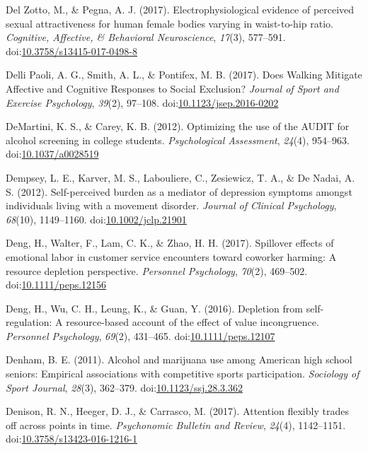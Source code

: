 \documentclass[english,man]{apa6}
\theoremstyle{definition}
\theoremstyle{definition}
\theoremstyle{definition}
\theoremstyle{remark}
\begin{document}
\hypertarget{ref-DelZotto2017}{}
Del Zotto, M., \& Pegna, A. J. (2017). Electrophysiological evidence of
perceived sexual attractiveness for human female bodies varying in
waist-to-hip ratio. \emph{Cognitive, Affective, \& Behavioral
Neuroscience}, \emph{17}(3), 577--591.
doi:\href{https://doi.org/10.3758/s13415-017-0498-8}{10.3758/s13415-017-0498-8}

\hypertarget{ref-Paoli2017}{}
Delli Paoli, A. G., Smith, A. L., \& Pontifex, M. B. (2017). Does
Walking Mitigate Affective and Cognitive Responses to Social Exclusion?
\emph{Journal of Sport and Exercise Psychology}, \emph{39}(2), 97--108.
doi:\href{https://doi.org/10.1123/jsep.2016-0202}{10.1123/jsep.2016-0202}

\hypertarget{ref-DeMartini2012}{}
DeMartini, K. S., \& Carey, K. B. (2012). Optimizing the use of the
AUDIT for alcohol screening in college students. \emph{Psychological
Assessment}, \emph{24}(4), 954--963.
doi:\href{https://doi.org/10.1037/a0028519}{10.1037/a0028519}

\hypertarget{ref-Dempsey2012}{}
Dempsey, L. E., Karver, M. S., Labouliere, C., Zesiewicz, T. A., \& De
Nadai, A. S. (2012). Self-perceived burden as a mediator of depression
symptoms amongst individuals living with a movement disorder.
\emph{Journal of Clinical Psychology}, \emph{68}(10), 1149--1160.
doi:\href{https://doi.org/10.1002/jclp.21901}{10.1002/jclp.21901}

\hypertarget{ref-Deng2017}{}
Deng, H., Walter, F., Lam, C. K., \& Zhao, H. H. (2017). Spillover
effects of emotional labor in customer service encounters toward
coworker harming: A resource depletion perspective. \emph{Personnel
Psychology}, \emph{70}(2), 469--502.
doi:\href{https://doi.org/10.1111/peps.12156}{10.1111/peps.12156}

\hypertarget{ref-Deng2016}{}
Deng, H., Wu, C. H., Leung, K., \& Guan, Y. (2016). Depletion from
self-regulation: A resource-based account of the effect of value
incongruence. \emph{Personnel Psychology}, \emph{69}(2), 431--465.
doi:\href{https://doi.org/10.1111/peps.12107}{10.1111/peps.12107}

\hypertarget{ref-Denham2011}{}
Denham, B. E. (2011). Alcohol and marijuana use among American high
school seniors: Empirical associations with competitive sports
participation. \emph{Sociology of Sport Journal}, \emph{28}(3),
362--379.
doi:\href{https://doi.org/10.1123/ssj.28.3.362}{10.1123/ssj.28.3.362}

\hypertarget{ref-Denison2017}{}
Denison, R. N., Heeger, D. J., \& Carrasco, M. (2017). Attention
flexibly trades off across points in time. \emph{Psychonomic Bulletin
and Review}, \emph{24}(4), 1142--1151.
doi:\href{https://doi.org/10.3758/s13423-016-1216-1}{10.3758/s13423-016-1216-1}
\end{document}
